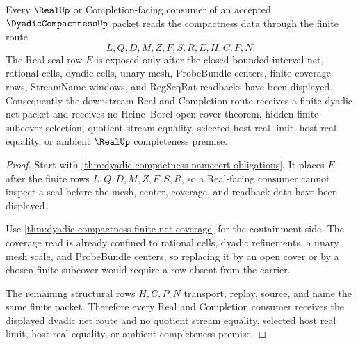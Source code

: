 \begin{theorem}
\label{thm:dyadic-compactness-real-seal-nonescape}
Every $\RealUp$ or Completion-facing consumer of an accepted $\DyadicCompactnessUp$ packet reads the compactness data through the finite route
$$
L,Q,D,M,Z,F,S,R,E,H,C,P,N.
$$
The Real seal row $E$ is exposed only after the closed bounded interval net, rational cells, dyadic cells, unary mesh, ProbeBundle centers, finite coverage rows, StreamName windows, and RegSeqRat readbacks have been displayed. Consequently the downstream Real and Completion route receives a finite dyadic net packet and receives no Heine--Borel open-cover theorem, hidden finite-subcover selection, quotient stream equality, selected host real limit, host real equality, or ambient $\RealUp$ completeness premise.
\end{theorem}
\begin{proof}
Start with \autoref{thm:dyadic-compactness-namecert-obligations}. It places $E$ after the finite rows $L,Q,D,M,Z,F,S,R$, so a Real-facing consumer cannot inspect a seal before the mesh, center, coverage, and readback data have been displayed.

Use \autoref{thm:dyadic-compactness-finite-net-coverage} for the containment side. The coverage read is already confined to rational cells, dyadic refinements, a unary mesh scale, and ProbeBundle centers, so replacing it by an open cover or by a chosen finite subcover would require a row absent from the carrier.

The remaining structural rows $H,C,P,N$ transport, replay, source, and name the same finite packet. Therefore every Real and Completion consumer receives the displayed dyadic net route and no quotient stream equality, selected host real limit, host real equality, or ambient completeness premise.
\end{proof}



